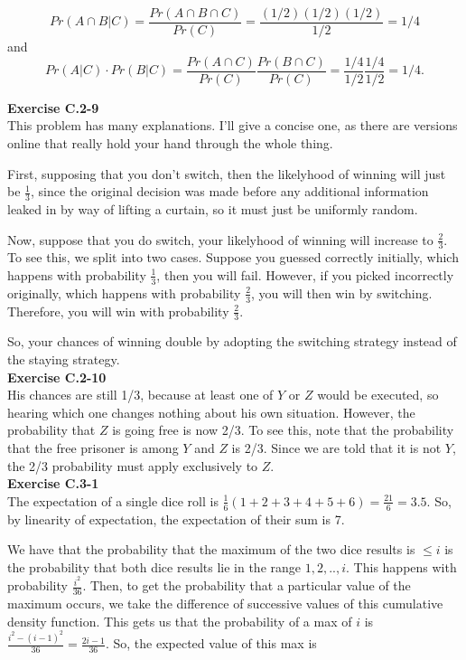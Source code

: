 \documentclass{article}
\begin{document}
\[ Pr(A \cap B | C) = \frac{Pr(A \cap B \cap C)}{Pr(C)} = \frac{(1/2)(1/2)(1/2)}{1/2} = 1/4\]
and
\[ Pr(A|C)\cdot Pr(B|C) = \frac{Pr(A \cap C)}{Pr(C)} \frac{Pr(B \cap C)}{Pr(C)} = \frac{1/4}{1/2} \frac{1/4}{1/2} = 1/4.\]

\noindent\textbf{Exercise C.2-9}\\

This problem has many explanations. I'll give a concise one, as there are versions online that really hold your hand through the whole thing.

First, supposing that you don't switch, then the likelyhood of winning will just be $\frac{1}{3}$, since the original decision was made before any additional information leaked in by way of lifting a curtain, so it must just be uniformly random.

Now, suppose that you do switch, your likelyhood of winning will increase to $\frac{2}{3}$. To see this, we split into two cases. Suppose you guessed correctly initially, which happens with probability $\frac{1}{3}$, then you will fail. However, if you picked incorrectly originally, which happens with probability $\frac{2}{3}$, you will then win by switching. Therefore, you will win with probability $\frac{2}{3}$.

So, your chances of winning double by adopting the switching strategy instead of the staying strategy.\\

\noindent\textbf{Exercise C.2-10}\\

His chances are still 1/3, because at least one of $Y$ or $Z$ would be executed, so hearing which one changes nothing about his own situation.  However, the probability that $Z$ is going free is now 2/3.  To see this, note that the probability that the free prisoner is among $Y$ and $Z$ is 2/3.  Since we are told that it is not $Y$, the 2/3 probability must apply exclusively to $Z$.  \\

\noindent\textbf{Exercise C.3-1}\\

The expectation of a single dice roll is $\frac{1}{6}(1+2+3+4+5+6) = \frac{21}{6} = 3.5$. So, by linearity of expectation, the expectation of their sum is 7.

We have that the probability that the maximum of the two dice results is $\le i$ is the probability that both dice results lie in the range $1,2,..,i$. This happens with probability $\frac{i^2}{36}$. Then, to get the probability that a particular value of the maximum occurs, we take the difference of successive values of this cumulative density function. This gets us that the probability of a max of $i$ is $\frac{i^2 - (i-1)^2}{36} = \frac{2i -1}{36}$. So, the expected value of this max is 
\end{document}
